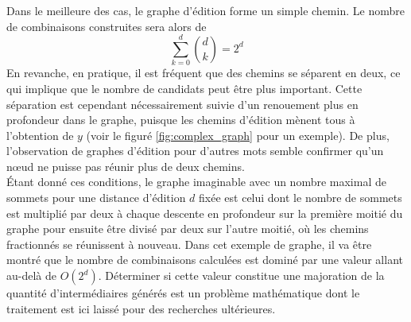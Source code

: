 \documentclass[12pt, twoside]{report}
\begin{document}
Dans le meilleure des cas, le graphe d'édition forme un simple chemin. Le nombre de combinaisons construites sera alors de
\begin{equation}
    \sum_{k=0}^{d} {{d}\choose{k}} = 2^d
\end{equation}
En revanche, en pratique, il est fréquent que des chemins se séparent en deux, ce qui implique que le nombre de candidats peut être plus important. Cette séparation est cependant nécessairement suivie d'un renouement plus en profondeur dans le graphe, puisque les chemins d'édition mènent tous à l'obtention de $y$ (voir le figuré \ref{fig:complex_graph} pour un exemple). De plus, l'observation de graphes d'édition pour d'autres mots semble confirmer qu'un n\oe{}ud ne puisse pas réunir plus de deux chemins.\\
Étant donné ces conditions, le graphe imaginable avec un nombre maximal de sommets pour une distance d'édition $d$ fixée est celui dont le nombre de sommets est multiplié par deux à chaque descente en profondeur sur la première moitié du graphe pour ensuite être divisé par deux sur l'autre moitié, où les chemins fractionnés se réunissent à nouveau. Dans cet exemple de graphe, il va être montré que le nombre de combinaisons calculées est dominé par une valeur allant au-delà de $O(2^d)$. Déterminer si cette valeur constitue une majoration de la quantité d'intermédiaires générés est un problème mathématique dont le traitement est ici laissé pour des recherches ultérieures.
\end{document}
